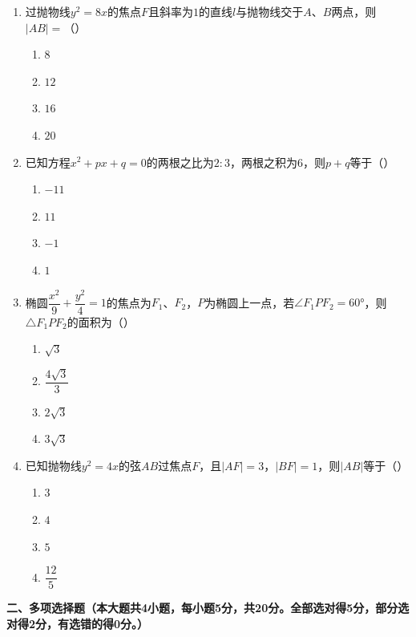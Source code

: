 \documentclass[12pt, a4paper]{ctexart}
\begin{document}
\begin{enumerate}[label=\Alph*.]
\item 过抛物线$y^2=8x$的焦点$F$且斜率为$1$的直线$l$与抛物线交于$A$、$B$两点，则$|AB|=$（\quad）
\begin{enumerate}[label=]
\item $8$ \qquad \item $12$ \qquad \item $16$ \qquad \item $20$
\end{enumerate}

\item 已知方程$x^2+px+q=0$的两根之比为$2:3$，两根之积为$6$，则$p+q$等于（\quad）
\begin{enumerate}[label=]
\item $-11$ \qquad \item $11$ \qquad \item $-1$ \qquad \item $1$
\end{enumerate}

\item 椭圆$\dfrac{x^2}{9}+\dfrac{y^2}{4}=1$的焦点为$F_1$、$F_2$，$P$为椭圆上一点，若$\angle F_1PF_2=60°$，则$\triangle F_1PF_2$的面积为（\quad）
\begin{enumerate}[label=]
\item $\sqrt{3}$ \qquad \item $\dfrac{4\sqrt{3}}{3}$ \qquad \item $2\sqrt{3}$ \qquad \item $3\sqrt{3}$
\end{enumerate}

\item 已知抛物线$y^2=4x$的弦$AB$过焦点$F$，且$|AF|=3$，$|BF|=1$，则$|AB|$等于（\quad）
\begin{enumerate}[label=]
\item $3$ \qquad \item $4$ \qquad \item $5$ \qquad \item $\dfrac{12}{5}$
\end{enumerate}

\end{enumerate}

\vspace{0.5em}

\noindent\textbf{二、多项选择题（本大题共4小题，每小题5分，共20分。全部选对得5分，部分选对得2分，有选错的得0分。）}
\end{document}
